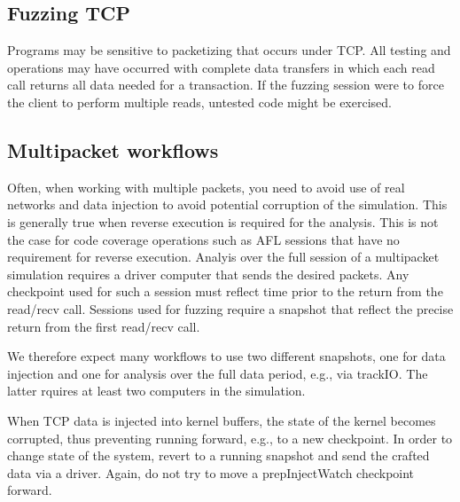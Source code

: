 \documentclass[titlepage]{article}
\begin{document}
\begin{appendices}
\subsection{Fuzzing TCP}
Programs may be sensitive to packetizing that occurs under TCP.  All testing and operations may have occurred with
complete data transfers in which each read call returns all data needed for a transaction.  If the fuzzing session
were to force the client to perform multiple reads, untested code might be exercised.

\subsection{Multipacket workflows}
Often, when working with multiple packets, you need to avoid use of real networks and data injection to avoid potential corruption of the simulation.
This is generally true when reverse execution is required for the analysis.  This is not the case for code coverage operations such as AFL sessions that
have no requirement for reverse execution.  Analyis over the full session of a multipacket simulation requires a driver computer that sends the desired
packets.  Any checkpoint used for such a session must reflect time prior to the return from the read/recv call.  Sessions used for fuzzing 
require a snapshot that reflect the precise return from the first read/recv call.  

We therefore expect many workflows to use two different snapshots, one for data injection and one for analysis over the full data period, e.g., via trackIO.
The latter rquires at least two computers in the simulation.  

When TCP data is injected into kernel buffers, the state of the kernel becomes corrupted, thus preventing running forward, e.g., to a new checkpoint.
In order to change state of the system, revert to a running snapshot and send the crafted data via a driver.  Again, do not try to move a prepInjectWatch
checkpoint forward.
\end{appendices}
\end{document}
